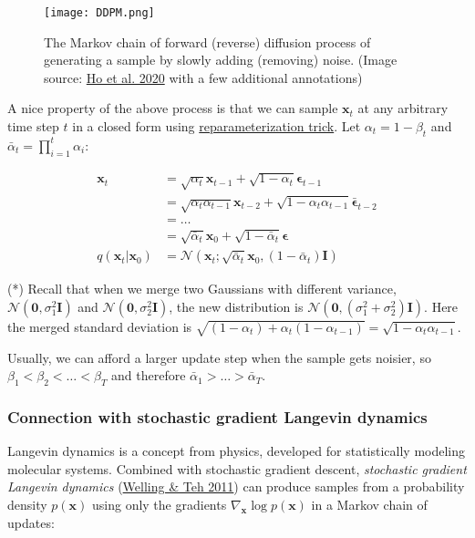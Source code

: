 \documentclass[12pt]{article}
\begin{document}
\begin{figure}[H]
    \centering
    \texttt{[image: DDPM.png]}
    \caption{The Markov chain of forward (reverse) diffusion process of generating a sample by slowly adding (removing) noise. (Image source: \href{https://arxiv.org/abs/2006.11239}{Ho et al. 2020} with a few additional annotations)}
\end{figure}

A nice property of the above process is that we can sample $\mathbf{x}_t$ at any arbitrary time step $t$ in a closed form using \href{https://lilianweng.github.io/posts/2018-08-12-vae/#reparameterization-trick}{reparameterization trick}. Let $\alpha_t = 1 - \beta_t$ and $\bar{\alpha}_t = \prod_{i=1}^t \alpha_i$:

\[
\begin{aligned}
\mathbf{x}_t 
&= \sqrt{\alpha_t}\mathbf{x}_{t-1} + \sqrt{1 - \alpha_t}\boldsymbol{\epsilon}_{t-1} \\
&= \sqrt{\alpha_t \alpha_{t-1}} \mathbf{x}_{t-2} + \sqrt{1 - \alpha_t \alpha_{t-1}} \bar{\boldsymbol{\epsilon}}_{t-2} \\
&= \dots \\
&= \sqrt{\bar{\alpha}_t}\mathbf{x}_0 + \sqrt{1 - \bar{\alpha}_t}\boldsymbol{\epsilon} \\
q(\mathbf{x}_t \vert \mathbf{x}_0) &= \mathcal{N}(\mathbf{x}_t; \sqrt{\bar{\alpha}_t} \mathbf{x}_0, (1 - \bar{\alpha}_t)\mathbf{I})
\end{aligned}
\]

(*) Recall that when we merge two Gaussians  with different variance, $\mathcal{N}(\mathbf{0}, \sigma_1^2\mathbf{I})$ and $\mathcal{N}(\mathbf{0}, \sigma_2^2\mathbf{I})$, the new distribution is $\mathcal{N}(\mathbf{0}, (\sigma_1^2 + \sigma_2^2)\mathbf{I})$. Here the merged standard deviation is $\sqrt{(1 - \alpha_t) + \alpha_t (1-\alpha_{t-1})} = \sqrt{1 - \alpha_t\alpha_{t-1}}$.

Usually, we can afford a larger update step when the sample gets noisier, so $\beta_1 < \beta_2 < \dots < \beta_T$ and therefore $\bar{\alpha}_1 > \dots > \bar{\alpha}_T$.

\subsubsection{Connection with stochastic gradient Langevin dynamics}

Langevin dynamics is a concept from physics, developed for statistically modeling molecular systems. Combined with stochastic gradient descent, \emph{stochastic gradient Langevin dynamics} (\href{https://www.stats.ox.ac.uk/~teh/research/compstats/WelTeh2011a.pdf}{Welling \& Teh 2011}) can produce samples from a probability density $p(\mathbf{x})$ using only the gradients $\nabla_\mathbf{x} \log p(\mathbf{x})$ in a Markov chain of updates:
\end{document}
